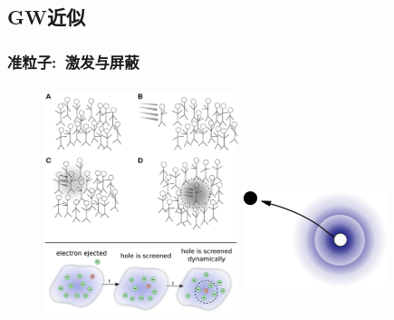 \subsection{\rm{GW}近似}
\frame
{
	\frametitle{准粒子:~激发与屏蔽}
\begin{figure}[h!]
	\vspace{-0.12in}
\centering
\includegraphics[height=2.65in,width=2.25in,viewport=0 0 510 575,clip]{Figures/DFT_GW-2.jpg}
\includegraphics[height=1.80in,width=1.65in,viewport=0 0 455 525,clip]{Figures/DFT_GW-electron.jpg}
\label{Green's_function-quasi-particle}
\end{figure}
}

